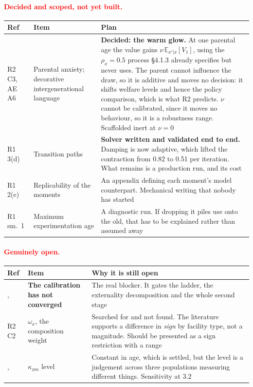 \documentclass[11pt]{article}
\newcommand{\nw}[1]{\textcolor{red}{#1}}
\begin{document}
\nw{\paragraph{Decided and scoped, not yet built.}}

{\color{red}\begin{longtable}{lL{5.0cm}L{6.4cm}}
\toprule
Ref & Item & Plan\\
\midrule
\endhead
R2 C3, AE A6 & Parental anxiety; decorative intergenerational language & \textbf{Decided: the warm glow.} At one parental age the value gains $\nu\,\mathbb{E}_{x'|x}[V_1]$, using the $\rho_x=0.5$ process \S4.1.3 already specifies but never uses. The parent cannot influence the draw, so it is additive and moves no decision: it shifts welfare levels and hence the policy comparison, which is what R2 predicts. $\nu$ cannot be calibrated, since it moves no behaviour, so it is a robustness range. Scaffolded inert at $\nu=0$\\
R1 3(d) & Transition paths & \textbf{Solver written and validated end to end.} Damping is now adaptive, which lifted the contraction from 0.82 to 0.51 per iteration. What remains is a production run, and its cost\\
R1 2(e) & Replicability of the moments & An appendix defining each moment's model counterpart. Mechanical writing that nobody has started\\
R1 sm.\ 1 & Maximum experimentation age & A diagnostic run. If dropping it piles use onto the old, that has to be explained rather than assumed away\\
\bottomrule
\end{longtable}}

\nw{\paragraph{Genuinely open.}}

{\color{red}\begin{longtable}{lL{5.0cm}L{6.4cm}}
\toprule
Ref & Item & Why it is still open\\
\midrule
\endhead
, & \textbf{The calibration has not converged} & The real blocker. It gates the ladder, the externality decomposition and the whole second stage\\
R2 C2 & $\omega_x$, the composition weight & Searched for and not found. The literature supports a difference in \emph{sign} by facility type, not a magnitude. Should be presented as a sign restriction with a range\\
, & $\kappa_{\phi m}$ level & Constant in age, which is settled, but the level is a judgement across three populations measuring different things. Sensitivity at 3.2\\
\bottomrule
\end{longtable}}
\end{document}
